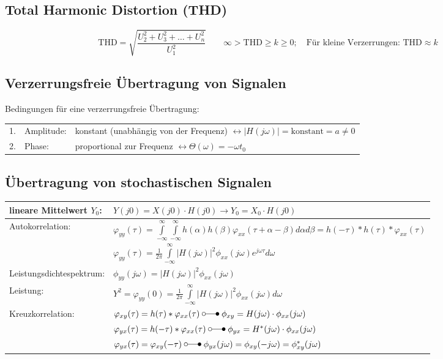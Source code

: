 \subsection{Total Harmonic Distortion (THD) }
$$\text{THD} = \sqrt{ \frac {U_2^2+ U_3^2 + \ldots + U_n^2} {U_1^2} } \qquad
\infty > \text{THD} \geq k \geq 0; \quad \text{Für kleine Verzerrungen: THD}
\approx k $$

\subsection{Verzerrungsfreie Übertragung von Signalen }
	Bedingungen für eine verzerrungsfreie Übertragung:\\
	\begin{tabular}{lll}
		1. & Amplitude: & konstant (unabhängig von der Frequenz) $\leftrightarrow
			|H(j\omega)| = \text{konstant} = a \neq 0$ \\
		2. & Phase: & proportional zur Frequenz $\leftrightarrow
			\Theta(\omega) = -\omega t_0$ 
	\end{tabular}
	
\subsection{Übertragung von stochastischen Signalen }
\begin{tabular}{|l|l|}
	\hline
		lineare Mittelwert $Y_0$: &
		$Y(j0) = X(j0) \cdot H(j0) \rightarrow Y_0 = X_0 \cdot H(j0)$ \\
	\hline
		Autokorrelation: &
		$\varphi_{yy}(\tau) = \int\limits_{-\infty}^{\infty} \int\limits_{-\infty}^{\infty}
		h(\alpha)h(\beta)\varphi_{xx}(\tau+\alpha-\beta)d\alpha d\beta = h(-\tau) * h(\tau) * \varphi_{xx}(\tau)$\\
		& $\varphi_{yy}(\tau) = \frac{1}{2\pi} \int\limits_{-\infty}^{\infty}|H(j\omega)|^2 \phi_{xx}(j\omega)
		e^{j\omega \tau} d\omega$ \\
	\hline
		Leistungsdichtespektrum: &
		$\phi_{yy}(j\omega) = |H(j\omega)|^2\phi_{xx}(j\omega)$\\
	\hline
		Leistung: &
		$Y^2 = \varphi_{yy}(0) = \frac{1}{2\pi}\int\limits_{-\infty}^{\infty}|H(j\omega)|^2\phi_{xx}(j\omega) d\omega$\\
	\hline
		Kreuzkorrelation: &
		$\varphi_{xy}(\tau) = h(\tau) * \varphi_{xx}(\tau) \; \laplace \; \phi_{xy} = H(j\omega) \cdot \phi_{xx}(j\omega)$ \\
		& $\varphi_{yx}(\tau) = h(-\tau) * \varphi_{xx}(\tau) \; \laplace \; \phi_{yx} = H^*(j\omega) \cdot \phi_{xx}(j\omega)$ \\
		& $\varphi_{yx}(\tau) = \varphi_{xy}(-\tau) \; \laplace \; \phi_{yx}(j\omega) = \phi_{xy}(-j\omega) = \phi_{xy}^*(j\omega)$\\
	\hline
\end{tabular}